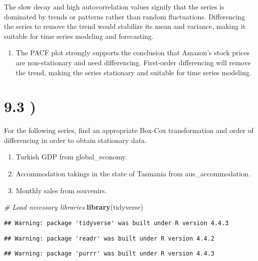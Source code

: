 \documentclass[
]{article}
\newenvironment{Shaded}{\begin{snugshade}}{\end{snugshade}}
\newcommand{\CommentTok}[1]{\textcolor[rgb]{0.56,0.35,0.01}{\textit{#1}}}
\newcommand{\FunctionTok}[1]{\textcolor[rgb]{0.13,0.29,0.53}{\textbf{#1}}}
\newcommand{\NormalTok}[1]{#1}
\providecommand{\tightlist}{%
  \setlength{\itemsep}{0pt}\setlength{\parskip}{0pt}}
\begin{document}
The slow decay and high autocorrelation values signify that the series
is dominated by trends or patterns rather than random fluctuations.
Differencing the series to remove the trend would stabilize its mean and
variance, making it suitable for time series modeling and forecasting.

\begin{enumerate}
\def\labelenumi{\arabic{enumi}.}
\setcounter{enumi}{2}
\tightlist
\item
  The PACF plot strongly supports the conclusion that Amazon's stock
  prices are non-stationary and need differencing. First-order
  differencing will remove the trend, making the series stationary and
  suitable for time series modeling.
\end{enumerate}

\section{9.3 )}\label{section-2}

For the following series, find an appropriate Box-Cox transformation and
order of differencing in order to obtain stationary data.

\begin{enumerate}
\def\labelenumi{\alph{enumi})}
\tightlist
\item
  Turkish GDP from global\_economy.
\item
  Accommodation takings in the state of Tasmania from
  aus\_accommodation.
\item
  Monthly sales from souvenirs.
\end{enumerate}

\begin{Shaded}
\begin{Highlighting}[]
\CommentTok{\# Load necessary libraries}
\FunctionTok{library}\NormalTok{(tidyverse)}
\end{Highlighting}
\end{Shaded}

\begin{verbatim}
## Warning: package 'tidyverse' was built under R version 4.4.3
\end{verbatim}

\begin{verbatim}
## Warning: package 'readr' was built under R version 4.4.2
\end{verbatim}

\begin{verbatim}
## Warning: package 'purrr' was built under R version 4.4.3
\end{verbatim}
\end{document}
